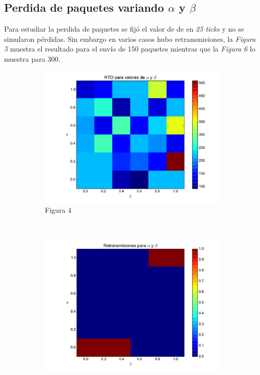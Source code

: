     \subsection{Perdida de paquetes variando $\alpha$ y $\beta$}
        Para estudiar la perdida de paquetes se fij\'o el valor de 
        de \rto{} en \textit{25 ticks} y no se simularon p\'erdidas.
        Sin embargo en varios casos hubo retransmisiones, la 
        \textit{Figura 5} muestra el resultado para el env\'io de 150
        paquetes mientras que la \textit{Figura 6} lo muestra para 300.
        
    \begin{figure}[H]
	    \center
	    \begin{subfigure}{0.32\textwidth}
		    \includegraphics[width=1.0\textwidth]{imagenes/rto_vs_alphaBeta.pdf}
		    \caption{Figura 4}
	    \end{subfigure}
	    ~
	    \begin{subfigure}{0.32\textwidth}
		    \includegraphics[width=1.0\textwidth]{imagenes/retransmisiones_150.pdf}

\end{subfigure}
\end{figure}
